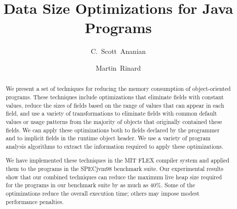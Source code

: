 \documentclass[oribibl]{llncs}
\title{Data Size Optimizations for Java Programs}
\author{C.~Scott~Ananian \and Martin~Rinard}
\institute{%
Laboratory for Computer Science\\
Massachusetts Institute of Technology\\ 
Cambridge, MA 02139 \\
\email{\{cananian, rinard\}@lcs.mit.edu}
}
\begin{document}

%
\maketitle
%
\begin{abstract}
We present a set of techniques for reducing the memory consumption of
object-oriented programs. These techniques 
include optimizations that eliminate fields with
constant values, reduce the sizes of fields based on the range
of values that can appear in each field, and use a variety of
transformations to eliminate fields with common default values
or usage patterns from the majority of objects that originally
contained these fields. We can apply these optimizations both 
to fields declared by the programmer and to implicit fields in
the runtime object header. We use a variety of program analysis 
algorithms to extract the information required to apply these
optimizations. 

We have implemented these techniques in the MIT FLEX compiler
system and applied them to the programs in the SPECjvm98 
benchmark suite. Our experimental results show that 
our combined techniques can reduce the maximum live heap size required
for the programs in our benchmark suite by as much as 40\%.
Some of the optimizations reduce the overall execution time;
others may impose modest performance penalties.
\end{abstract}
%
\end{document}
